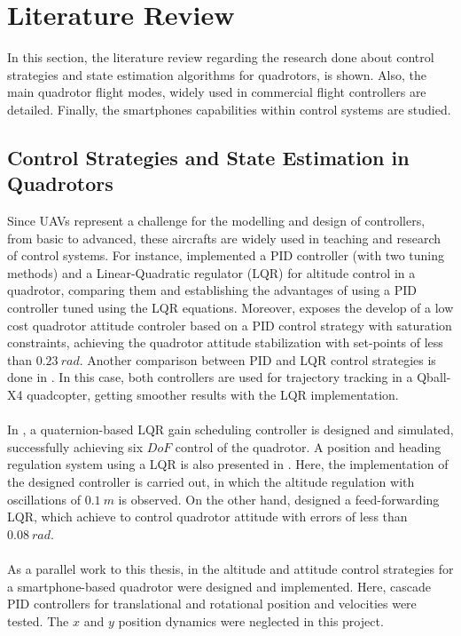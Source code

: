 \section{Literature Review}
In this section, the literature review regarding the research done about control strategies and state estimation algorithms for quadrotors, is shown. Also, the main quadrotor flight modes, widely used in commercial flight controllers are detailed. Finally, the smartphones capabilities within control systems are studied.

\subsection{Control Strategies and State Estimation in Quadrotors}
Since UAVs represent a challenge for the modelling and design of controllers, from basic to advanced, these aircrafts are widely used in teaching and research of control systems. For instance, \cite{Argentim2013} implemented a PID controller (with two tuning methods) and a Linear-Quadratic regulator (LQR) for altitude control in a quadrotor, comparing them and establishing the advantages of using a PID controller tuned using the LQR equations. Moreover, \cite{Silva2016} exposes the develop of a low cost quadrotor attitude controler based on a PID control strategy with saturation constraints, achieving the quadrotor attitude stabilization with set-points of less than $0.23\ rad$. Another comparison between PID and LQR control strategies is done in \cite{Liu2016}. In this case, both controllers are used for trajectory tracking in a Qball-X4 quadcopter, getting smoother results with the LQR implementation.
\\\\
In \cite{Reyes-Valeria2013}, a quaternion-based LQR gain scheduling controller is designed and simulated, successfully achieving six $DoF$ control of the quadrotor. A position and heading regulation system using a LQR is also presented in \cite{Dong2015}. Here, the implementation of the designed controller is carried out, in which the altitude regulation with oscillations of $0.1\ m$ is observed. On the other hand, \cite{Fan2017} designed a feed-forwarding LQR, which achieve to control quadrotor attitude with errors of less than $0.08\ rad$.
\\\\
As a parallel work to this thesis, in \cite{Munoz2017} the altitude and attitude control strategies for a smartphone-based quadrotor were designed and implemented. Here, cascade PID controllers for translational and rotational position and velocities were tested. The $x$ and $y$ position dynamics were neglected in this project.
